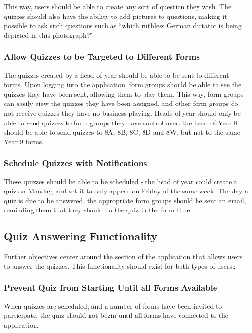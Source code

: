 This way, users should be able to create any sort of question they wish. The quizzes should also have the ability to add pictures to questions, making it possible to ask such questions such as ``which ruthless German dictator is being depicted in this photograph?''

\subsubsection{Allow Quizzes to be Targeted to Different Forms}
The quizzes created by a head of year should be able to be sent to different forms. Upon logging into the application, form groups should be able to see the quizzes they have been sent, allowing them to play them. This way, form groups can easily view the quizzes they have been assigned, and other form groups do not receive quizzes they have no business playing. Heads of year should only be able to send quizzes to form groups they have control over: the head of Year 8 should be able to send quizzes to 8A, 8B, 8C, 8D and 8W, but not to the same Year 9 forms.

\subsubsection{Schedule Quizzes with Notifications}
These quizzes should be able to be scheduled - the head of year could create a quiz on Monday, and set it to only appear on Friday of the same week. The day a quiz is due to be answered, the appropriate form groups should be sent an email, reminding them that they should do the quiz in the form time.

\subsection{Quiz Answering Functionality}
Further objectives center around the section of the application that allows users to answer the quizzes. This functionality should exist for both types of users.;

\subsubsection{Prevent Quiz from Starting Until all Forms Available}
When quizzes are scheduled, and a number of forms have been invited to participate, the quiz should not begin until all forms have connected to the application. 





